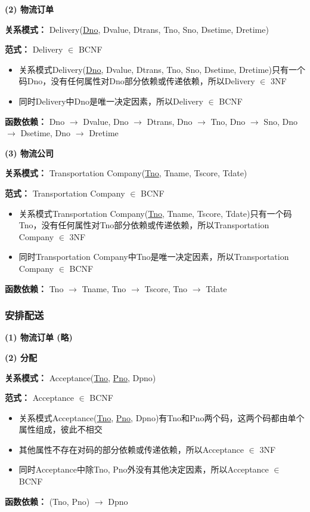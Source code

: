 \documentclass[12pt]{article}
\begin{document}
\vspace{0.3cm}
\noindent \textbf{(2) 物流订单} \par 
\noindent \textbf{关系模式：} Delivery(\uline{Dno}, Dvalue, Dtrans, Tno, Sno, Dsetime, Dretime) \par 
\noindent \textbf{范式：} Delivery $\in$ BCNF \par 
\begin{itemize}
	\item 关系模式Delivery(\uline{Dno}, Dvalue, Dtrans, Tno, Sno, Dsetime, Dretime)只有一个码Dno，没有任何属性对Dno部分依赖或传递依赖，所以Delivery $\in$ 3NF
	\item 同时Delivery中Dno是唯一决定因素，所以Delivery $\in$ BCNF
\end{itemize}
\textbf{函数依赖：} Dno $\rightarrow$ Dvalue, Dno $\rightarrow$ Dtrans, Dno $\rightarrow$ Tno, Dno $\rightarrow$ Sno, Dno $\rightarrow$ Dsetime, Dno $\rightarrow$ Dretime

\vspace{0.3cm}
\noindent \textbf{(3) 物流公司} \par 
\noindent \textbf{关系模式：} Transportation Company(\uline{Tno}, Tname,  Tscore, Tdate) \par 
\noindent \textbf{范式：} Transportation Company $\in$ BCNF \par 
\begin{itemize}
	\item 关系模式Transportation Company(\uline{Tno}, Tname, Tscore, Tdate)只有一个码Tno，没有任何属性对Tno部分依赖或传递依赖，所以Transportation Company $\in$ 3NF
	\item 同时Transportation Company中Tno是唯一决定因素，所以Transportation Company $\in$ BCNF
\end{itemize}
\textbf{函数依赖：} Tno $\rightarrow$ Tname, Tno $\rightarrow$ Tscore, Tno $\rightarrow$ Tdate

\subsubsection{安排配送}
\noindent \textbf{(1) 物流订单 (略)} 

\vspace{0.3cm}
\noindent \textbf{(2) 分配} \par 
\noindent \textbf{关系模式：} Acceptance(\uline{Tno}, \uline{Pno}, Dpno) \par 
\noindent \textbf{范式：} Acceptance $\in$ BCNF \par 
\begin{itemize}
	\item 关系模式Acceptance(\uline{Tno}, \uline{Pno}, Dpno)有Tno和Pno两个码，这两个码都由单个属性组成，彼此不相交
	\item 其他属性不存在对码的部分依赖或传递依赖，所以Acceptance $\in$ 3NF
	\item 同时Acceptance中除Tno, Pno外没有其他决定因素，所以Acceptance $\in$ BCNF
\end{itemize}
\textbf{函数依赖：} (Tno, Pno) $\rightarrow$ Dpno
\end{document}
